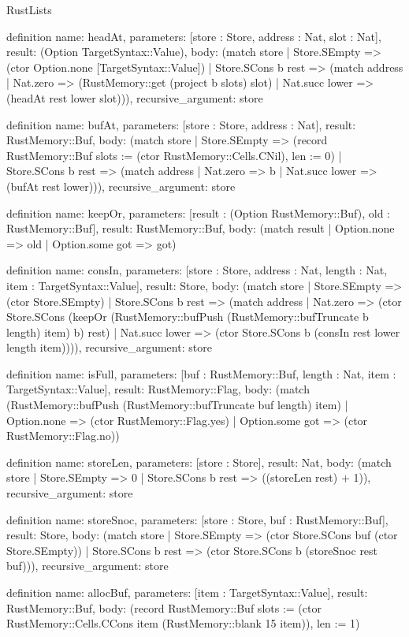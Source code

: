 \begin{lexlean}{RustLists}
\begin{semanticmodule}
definition{
  name: headAt,
  parameters: [store : Store, address : Nat, slot : Nat],
  result: (Option TargetSyntax::Value),
  body: (match store
    | Store.SEmpty => (ctor Option.none [TargetSyntax::Value])
    | Store.SCons b rest => (match address
      | Nat.zero => (RustMemory::get (project b slots) slot)
      | Nat.succ lower => (headAt rest lower slot))),
  recursive_argument: store
}

definition{
  name: bufAt,
  parameters: [store : Store, address : Nat],
  result: RustMemory::Buf,
  body: (match store
    | Store.SEmpty => (record RustMemory::Buf {slots := (ctor RustMemory::Cells.CNil), len := 0})
    | Store.SCons b rest => (match address | Nat.zero => b | Nat.succ lower => (bufAt rest lower))),
  recursive_argument: store
}

definition{
  name: keepOr,
  parameters: [result : (Option RustMemory::Buf), old : RustMemory::Buf],
  result: RustMemory::Buf,
  body: (match result | Option.none => old | Option.some got => got)
}

definition{
  name: consIn,
  parameters: [store : Store, address : Nat, length : Nat, item : TargetSyntax::Value],
  result: Store,
  body: (match store
    | Store.SEmpty => (ctor Store.SEmpty)
    | Store.SCons b rest => (match address
      | Nat.zero => (ctor Store.SCons (keepOr (RustMemory::bufPush (RustMemory::bufTruncate b length) item) b) rest)
      | Nat.succ lower => (ctor Store.SCons b (consIn rest lower length item)))),
  recursive_argument: store
}

definition{
  name: isFull,
  parameters: [buf : RustMemory::Buf, length : Nat, item : TargetSyntax::Value],
  result: RustMemory::Flag,
  body: (match (RustMemory::bufPush (RustMemory::bufTruncate buf length) item)
    | Option.none => (ctor RustMemory::Flag.yes)
    | Option.some got => (ctor RustMemory::Flag.no))
}

definition{
  name: storeLen,
  parameters: [store : Store],
  result: Nat,
  body: (match store | Store.SEmpty => 0 | Store.SCons b rest => ((storeLen rest) + 1)),
  recursive_argument: store
}

definition{
  name: storeSnoc,
  parameters: [store : Store, buf : RustMemory::Buf],
  result: Store,
  body: (match store
    | Store.SEmpty => (ctor Store.SCons buf (ctor Store.SEmpty))
    | Store.SCons b rest => (ctor Store.SCons b (storeSnoc rest buf))),
  recursive_argument: store
}

definition{
  name: allocBuf,
  parameters: [item : TargetSyntax::Value],
  result: RustMemory::Buf,
  body: (record RustMemory::Buf {slots := (ctor RustMemory::Cells.CCons item (RustMemory::blank 15 item)), len := 1})
}


\end{semanticmodule}
\end{lexlean}
